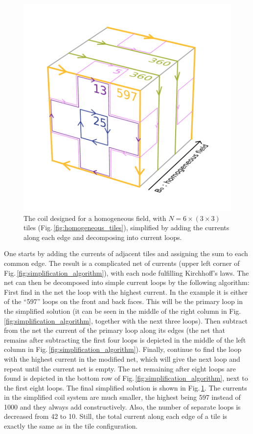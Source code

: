 \begin{figure}
  \centering
  \includegraphics[width=\linewidth]{gfx/coils/algorithm_simplified_5.pdf}
  \caption{The coil designed for a homogeneous field, with $N = 6 \times (3 \times 3)$ tiles (Fig.\,\ref{fig:homogeneous_tiles}), simplified by adding the currents along each edge and decomposing into current loops.}\label{fig:homogeneous_coils}
\end{figure}

One starts by adding the currents of adjacent tiles and assigning the sum to each common edge.
The result is a complicated net of currents (upper left corner of Fig.\,\ref{fig:simplification_algorithm}), with each node fulfilling Kirchhoff's laws. The net can then be decomposed into simple current loops by the following algorithm: First find in the net the loop with the highest current.
In the example it is either of the ``\num{597}'' loops on the front and back faces.
This will be the primary loop in the simplified solution (it can be seen in the middle of the right column in Fig.\,\ref{fig:simplification_algorithm}, together with the next three loops).
Then subtract from the net the current of the primary loop along its edges (the net that remains after subtracting the first four loops is depicted in the middle of the left column in Fig.\,\ref{fig:simplification_algorithm}).
Finally, continue to find the loop with the highest current in the modified net, which will give the next loop and repeat until the current net is empty.
The net remaining after eight loops are found is depicted in the bottom row of Fig.\,\ref{fig:simplification_algorithm}, next to the first eight loops.
The final simplified solution is shown in Fig.\,\ref{fig:homogeneous_coils}.
The currents in the simplified coil system are much smaller, the highest being \num{597} instead of \num{1000} and they always add constructively.
Also, the number of separate loops is decreased from \num{42} to \num{10}.
Still, the total current along each edge of a tile is exactly the same as in the tile configuration.

